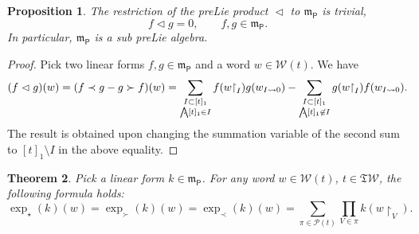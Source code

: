 \documentclass[pdftex]{sigma}
\renewcommand{\restriction}[2]{{#1\mathbin{\upharpoonright}_{#2}}}
\newcommand{\translucidation}[2]{{{#1}_{#2\leadsto0}}}
\newcommand{\bigwedgedots}{{\mathop{\bigwedge\hspace{-6.5pt}\raisebox{-1.5pt}[0pt][0pt]{$\cdot$}\hspace{2pt}}\nolimits}}
\newcommand{\SWc}{{\mathfrak{T}\mathcal{W}}}
\newcommand\IWc{\mathcal{W}}
\newcommand{\BPc}{{\mathcal{P}}}
\newcommand{\shalII}{{\mathfrak m}_{\mathsf P}}
\numberwithin{equation}{section}
\newtheorem{Theorem}{Theorem}[section]
\newtheorem{Proposition}[Theorem]{Proposition}
\begin{document}
\begin{Proposition}	\label{prop:trivial} The restriction of the preLie product $\vartriangleleft$ to $\shalII$ is trivial,
	\begin{equation*}
		f \vartriangleleft g = 0,\qquad f,g \in \shalII.
	\end{equation*}
	In particular, $\shalII$ is a sub preLie algebra.
\end{Proposition}
\begin{proof}
	Pick two linear forms $f,g \in \shalII$ and a word $w\in \IWc(t)$. We have
	\begin{align*}
		(f\vartriangleleft g)(w) = (f\prec g - g\succ f)(w) = \sum_{\substack{I \subset [t]_1 \\ \bigwedgedots [t]_1 \in I}}f(\restriction{w}{I})g(\translucidation{w}{I}) - \sum_{\substack{I\subset [t]_1 \\ \bigwedgedots [t]_1 \not\in I}}g(\restriction{w}{I})f(\translucidation{w}{I}).
	\end{align*}
	The result is obtained upon changing the summation variable of the second sum to $[t]_1\setminus I$ in the above equality.
\end{proof}
\begin{Theorem}
	Pick a linear form $k \in \shalII$. For any word $w\in \IWc(t)$, $t\in \SWc$, the following formula holds:
	\begin{equation}
		\label{eqn:formulaclassical}
		\exp_{\star}(k)(w)=\exp_{\succ}(k)(w) = \exp_{\prec}(k)(w) = \sum_{\pi \in \BPc(t)} \prod_{V\in\pi} k(\restriction{w}{V}).
	\end{equation}
\end{Theorem}
\end{document}
